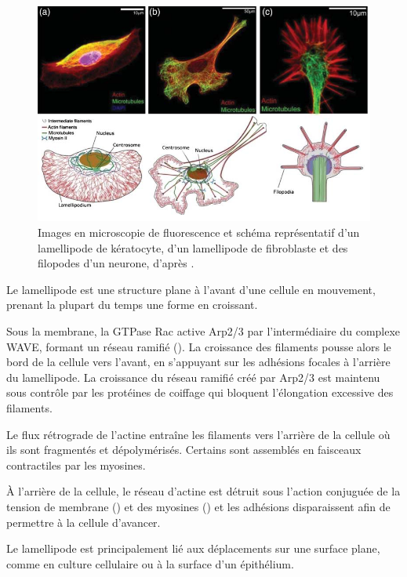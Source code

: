 \begin{figure}[h!]
\includegraphics[scale=0.6]{Figures/lamellipode.png}
\caption{Images en microscopie de fluorescence et schéma représentatif d'un lamellipode de kératocyte, d'un lamellipode de fibroblaste et des filopodes d'un neurone, d'après \cite{huber_emergent_2013}. } 
\end{figure}

Le lamellipode est une structure plane à l'avant d'une cellule en mouvement, prenant la plupart du temps une forme en croissant. 

Sous la membrane, la GTPase Rac active Arp2/3 par l'intermédiaire du complexe WAVE, formant un réseau ramifié (\cite{lebensohn_activation_2009}). 
La croissance des filaments pousse alors le bord de la cellule vers l'avant, en s'appuyant sur les adhésions focales à l'arrière du lamellipode. 
La croissance du réseau ramifié créé par Arp2/3 est maintenu sous contrôle par les protéines de coiffage qui bloquent l'élongation excessive des filaments. 

Le flux rétrograde de l'actine entraîne les filaments vers l'arrière de la cellule où ils sont fragmentés et dépolymérisés. 
Certains sont assemblés en faisceaux contractiles par les myosines. 

À l'arrière de la cellule, le réseau d'actine est détruit sous l'action conjuguée de la tension de membrane (\cite{raucher_cell_2000}) et des myosines (\cite{wilson_myosin_2010}) et les adhésions disparaissent afin de permettre à la cellule d'avancer.

Le lamellipode est principalement lié aux déplacements sur une surface plane, comme en culture cellulaire ou à la surface d'un épithélium. 



